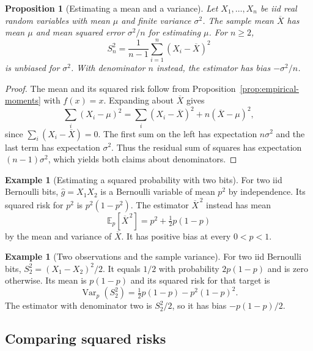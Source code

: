 \documentclass[11pt,oneside]{book}
\newtheorem{proposition}[theorem]{Proposition}
\theoremstyle{definition}
\newtheorem{example}[theorem]{Example}
\theoremstyle{remark}
\begin{document}
\begin{proposition}[Estimating a mean and a variance]
\label{prop:sample-mean-variance-moments}
Let $X_1,\ldots,X_n$ be iid real random variables with mean $\mu$
and finite variance $\sigma^2$. The sample mean $\overline X$ has
mean $\mu$ and mean squared error $\sigma^2/n$ for estimating $\mu$.
For $n\geq2$,
\[
S_n^2=\frac1{n-1}\sum_{i=1}^n(X_i-\overline X)^2
\]
is unbiased for $\sigma^2$. With denominator $n$ instead, the
estimator has bias $-\sigma^2/n$.
\end{proposition}
\begin{proof}
The mean and its squared risk follow from
Proposition~\ref{prop:empirical-moments} with $f(x)=x$. Expanding
about $\overline X$ gives
\[
\sum_i(X_i-\mu)^2
=\sum_i(X_i-\overline X)^2+n(\overline X-\mu)^2,
\]
since $\sum_i(X_i-\overline X)=0$. The first sum on the left has
expectation $n\sigma^2$ and the last term has expectation $\sigma^2$.
Thus the residual sum of squares has expectation $(n-1)\sigma^2$,
which yields both claims about denominators.
\end{proof}

\begin{example}[Estimating a squared probability with two bits]
\label{ex:unbiased-squared-probability-two-bits}
For two iid Bernoulli bits, $\widehat g=X_1X_2$ is a Bernoulli
variable of mean $p^2$ by independence. Its squared risk for
$p^2$ is $p^2(1-p^2)$. The estimator $\overline X^{\,2}$ instead
has mean
\[
\mathbb E_p[\overline X^{\,2}]=p^2+\tfrac12p(1-p)
\]
by the mean and variance of $\overline X$. It has positive bias
at every $0<p<1$.
\end{example}

\begin{example}[Two observations and the sample variance]
\label{ex:sample-variance-two-bits}
For two iid Bernoulli bits, $S_2^2=(X_1-X_2)^2/2$.
It equals $1/2$ with probability $2p(1-p)$ and is zero otherwise.
Its mean is $p(1-p)$ and its squared risk for that target is
\[
\operatorname{Var}_p(S_2^2)
=\tfrac12p(1-p)-p^2(1-p)^2.
\]
The estimator with denominator two is $S_2^2/2$, so it has
bias $-p(1-p)/2$.
\end{example}

\subsection{Comparing squared risks}
\label{subsec:comparing-estimator-squared-risks}
\end{document}
